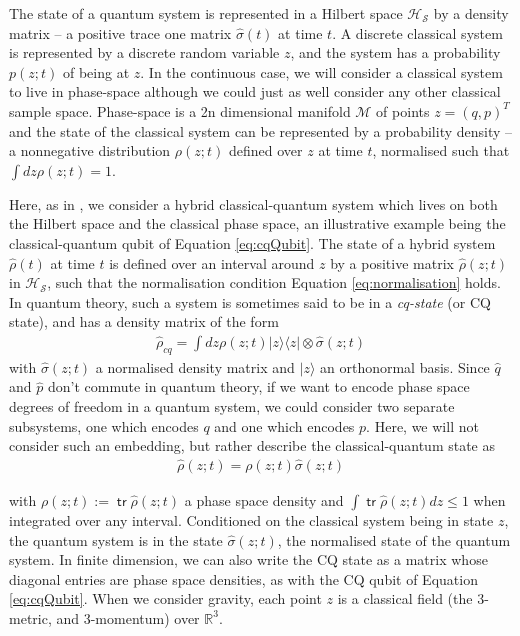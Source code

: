\documentclass[aps,pra,showpacs,citeautoscript,amsmath,amssymb,floatfix,superscriptaddress,bbm, verbatim,amsfonts,changes,10pt,nofootinbib,longbibliography]{revtex4-1}
\newcommand{\tr}{\mathop{\mathsf{tr}}\nolimits}
\newcommand{\ket}[1]{|#1\rangle}
\newcommand{\proj}[1]{|#1\rangle\!\langle#1|}
\def\p{{\bf p}_{\vec k}}
\def\z{{z}}
\def\q{{q}}
\def\p{{p}}
\renewcommand{\varrho}{\hat{\rho}}
\def\cqstate{\varrho}
\def\psiz{{\varrho(\z;t)}}
\begin{document}
The state of a quantum system is represented in a Hilbert space $\mathcal{H_S}$ by a density matrix -- a positive trace one matrix $\hat{\sigma}(t)$ at time $t$.  A discrete %
classical system is represented by a discrete random variable $\z$, and the system has a probability $p(\z;t)$ of being at $\z$.  In the continuous case, we will consider a classical system to live in phase-space although we could just as well consider any other classical sample space. Phase-space is a 2n dimensional manifold ${\mathcal M}$ of points $\z=(\q,\p)^T$ and the state of the classical system can be represented by a probability density -- a nonnegative distribution %
 $\rho(\z;t)$ defined over $\z$ at time $t$, normalised such that $\int d\z \rho(\z;t)=1$.

Here, as in \cite{aleksandrov1981statistical,gerasimenko1982dynamical, blanchard1993interaction,blanchard1995event,diosi1995quantum, diosi2014hybrid,alicki2003completely,poulinKITP}, we consider a hybrid classical-quantum system which lives on both the Hilbert space and the classical phase space, an illustrative example being the classical-quantum qubit of Equation \eqref{eq:cqQubit}. The state of a hybrid system $\cqstate(t)$ at time $t$ is defined over an interval around $\z$ by a positive  matrix $\cqstate(\z;t)$ in $\mathcal{H_S}$\cite{barb_foot}, such that the normalisation condition Equation \eqref{eq:normalisation} holds. 
In quantum theory, such a system is sometimes said to be in a {\it cq-state} (or CQ state), and has a density matrix of the form %
\begin{align}
\varrho_{cq}=\int d\z\rho(\z;t)\proj{\z}\otimes\hat{\sigma}({\z;t})  
\label{eq:cq-state}
\end{align}
with $\hat{\sigma}(\z;t)$ a normalised density matrix and $\ket{\z}$ an orthonormal basis.
Since $\hat{q}$ and $\hat{p}$ don't commute in quantum theory, if we want to 
encode phase space degrees of freedom in a quantum system, we could consider two separate subsystems, one which encodes $q$ and one which encodes $p$.\label{ft:embed}
Here, we will not consider such an embedding, but rather describe the classical-quantum
 state as 
 \begin{align}
 \cqstate(\z;t)=\rho(\z;t)\hat{\sigma}(\z;t)
 \label{eq:cqRef3}
 \end{align}

with %
 $\rho(\z;t):=\tr\psiz$ a phase space density and $\int\tr\psiz d\z \leq 1$ when integrated over any interval.\label{par:subnormal} 
Conditioned on the classical system being in state $\z$, the quantum system is in the state $\hat{\sigma}(\z;t)$, the normalised state of the quantum system. In finite dimension, we can also write the CQ state as a matrix whose diagonal entries are phase space densities, as with the CQ qubit of Equation \eqref{eq:cqQubit}.
When we consider gravity,
each point $\z$ is a classical field (the 3-metric, and 3-momentum) over $\mathbb{R}^3$.
\end{document}
